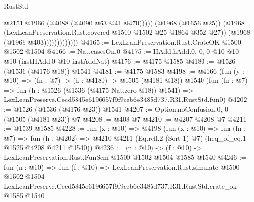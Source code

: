 \begin{lexlean}{RustStd}
\begin{coremodule}
                                @2151
                                @1966
                                (@4088 (@4090 @63 @41 @470)))))
                          (@1968 (@1656 @25))
                          (@1968 (LexLeanPreservation.Rust.covered @1500 @1502 @25 @1864 @352 @27))
                          (@1968 (@1969 @403)))))))))))))
@4165 := LexLeanPreservation.Rust.CrateOK @1500 @1502 @1504
@4166 := Nat.casesOn.{0}
@4175 := HAdd.hAdd.{0, 0, 0} @10 @10 @10 (instHAdd.{0} @10 instAddNat)
@4176 := @4175 @1585
@4180 := @1526 (@1536 (@4176 @18)) @1541
@4181 := @4175 @1583
@4198 := @4166
    (fun (y : @10) => (fn : @7) -> (h : @4180) -> @1505 (@4181 @18))
    @1540
    (fun (fn : @7) =>
    fun (h : @1526 (@1536 (@4175 Nat.zero @18)) @1541) =>
    LexLeanPreserve.Cecd5845e6196657f9f9ceb6e3485d737.R31.RustStd.fun0)
@4202 := @1526 (@1536 (@4176 @23)) @1541
@4207 := Option.noConfusion.{0, 0} (@1505 (@4181 @23)) @7
@4208 := @408 @7
@4210 := @4207 @4208 @7
@4211 := @1539 @1585
@4228 := fun (x : @10) =>
  @4198
    (fun (x : @10) =>
    fun (fn : @7) =>
    fun (h : @4202) =>
    @4210 @4211 (Eq.refl.{2} (Sort 1) @7) (heq_of_eq.{1} @1525 @4208 @4211 @1540))
@4236 := (n : @10) -> (f : @10) -> LexLeanPreservation.Rust.FunSem @1500 @1502 @1504 @1585 @1540
@4246 := fun (n : @10) =>
  fun (f : @10) =>
  LexLeanPreservation.Rust.simulate
    @1500
    @1502
    @1504
    LexLeanPreserve.Cecd5845e6196657f9f9ceb6e3485d737.R31.RustStd.crate_ok
    @1585
    @1540
\end{coremodule}
\end{lexlean}
